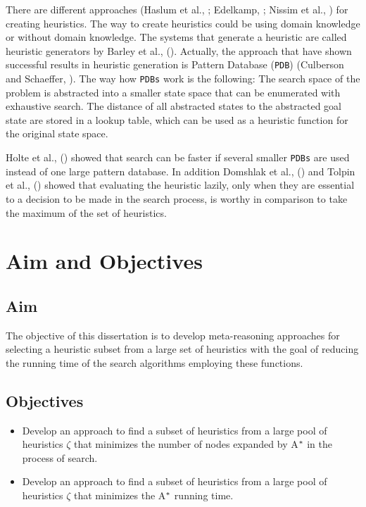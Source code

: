 There are different approaches (Haslum et al., \citeyear{haslum2007domain}; Edelkamp, \citeyear{edelkamp2007automated}; Nissim et al., \citeyear{nissim2011computing}) for creating heuristics. The way to create heuristics could be using domain knowledge or without domain knowledge. The systems that generate a heuristic are called heuristic generators by Barley et al., (\citeyear{BarleySantiagoOver}). Actually, the approach that have shown successful results in heuristic generation is Pattern Database (\texttt{PDB}) (Culberson and Schaeffer, \citeyear{culberson1998pattern}). The way how \texttt{PDBs} work is the following: The search space of the problem is abstracted into a smaller state space that can be enumerated with exhaustive search. The distance of all abstracted states to the abstracted goal state are stored in a lookup table, which can be used as a heuristic function for the original state space.

Holte et al., (\citeyear{holte2006maximizing}) showed that search can be faster if several smaller \texttt{PDBs} are used instead of one large pattern database. In addition Domshlak et al., (\citeyear{domshlak2010max}) and Tolpin et al.,  (\citeyear{tolpin2013towards}) showed that evaluating the heuristic lazily, only when they are essential to a decision to be made in the search process, is worthy in comparison to take the maximum of the set of heuristics.
\section{Aim and Objectives}
\subsection{Aim}
\noindent
The objective of this dissertation is to develop meta-reasoning approaches for selecting a heuristic subset from a large set of heuristics with the goal of reducing the running time of the search algorithms employing these functions.

\subsection{Objectives}
\noindent

\begin{itemize}
  \item Develop an approach to find a subset of heuristics from a large pool of heuristics $\zeta$ that minimizes the number of nodes expanded by A$\sp{*}$ in the process of search.
  
  \item Develop an approach to find a subset of heuristics from a large pool of heuristics $\zeta$ that minimizes the A$\sp{*}$ running time.

\end{itemize}
